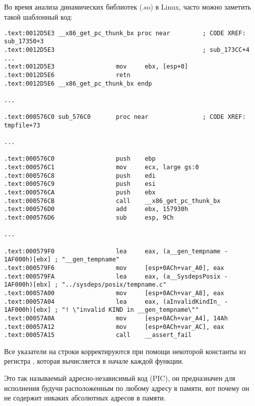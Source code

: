 \subsection{\CapitalPICcode}
\myindex{\PICcode}
\label{sec:PIC}

Во время анализа динамических библиотек (.so) в Linux, часто можно заметить такой шаблонный код:

\begin{lstlisting}[caption=libc-2.17.so x86,style=customasmx86]
.text:0012D5E3 __x86_get_pc_thunk_bx proc near         ; CODE XREF: sub_17350+3
.text:0012D5E3                                         ; sub_173CC+4 ...
.text:0012D5E3                 mov     ebx, [esp+0]
.text:0012D5E6                 retn
.text:0012D5E6 __x86_get_pc_thunk_bx endp

...

.text:000576C0 sub_576C0       proc near               ; CODE XREF: tmpfile+73

...

.text:000576C0                 push    ebp
.text:000576C1                 mov     ecx, large gs:0
.text:000576C8                 push    edi
.text:000576C9                 push    esi
.text:000576CA                 push    ebx
.text:000576CB                 call    __x86_get_pc_thunk_bx
.text:000576D0                 add     ebx, 157930h
.text:000576D6                 sub     esp, 9Ch

...

.text:000579F0                 lea     eax, (a__gen_tempname - 1AF000h)[ebx] ; "__gen_tempname"
.text:000579F6                 mov     [esp+0ACh+var_A0], eax
.text:000579FA                 lea     eax, (a__SysdepsPosix - 1AF000h)[ebx] ; "../sysdeps/posix/tempname.c"
.text:00057A00                 mov     [esp+0ACh+var_A8], eax
.text:00057A04                 lea     eax, (aInvalidKindIn_ - 1AF000h)[ebx] ; "! \"invalid KIND in __gen_tempname\""
.text:00057A0A                 mov     [esp+0ACh+var_A4], 14Ah
.text:00057A12                 mov     [esp+0ACh+var_AC], eax
.text:00057A15                 call    __assert_fail
\end{lstlisting}

Все указатели на строки корректируются при помощи некоторой константы из регистра \EBX, которая вычисляется в начале каждой функции.

Это так называемый адресно-независимый код (\ac{PIC}), он предназначен для исполнения будучи расположенным по любому адресу в памяти, вот почему он не содержит никаких абсолютных адресов в памяти.

